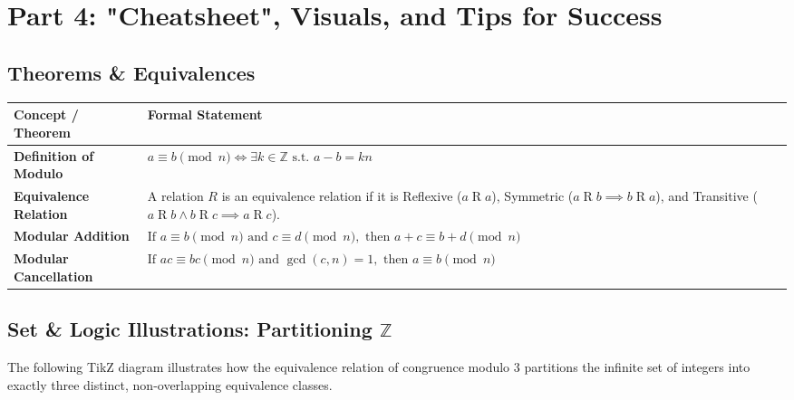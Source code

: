 \documentclass[11pt, a4paper]{article}
\theoremstyle{definition}
\theoremstyle{remark}
\begin{document}
\newpage
\section{Part 4: "Cheatsheet", Visuals, and Tips for Success}

\subsection{Theorems \& Equivalences}
\renewcommand{\arraystretch}{1.5}
\begin{tabularx}{\textwidth}{l X}
\toprule
\textbf{Concept / Theorem} & \textbf{Formal Statement} \\
\midrule
\textbf{Definition of Modulo} & $\displaystyle a \equiv b \pmod{n} \iff \exists k \in \mathbb{Z} \text{ s.t. } a - b = kn$ \\
\addlinespace[4pt]
\textbf{Equivalence Relation} & A relation $R$ is an equivalence relation if it is Reflexive ($a \mathrel{R} a$), Symmetric ($a \mathrel{R} b \implies b \mathrel{R} a$), and Transitive ($a \mathrel{R} b \land b \mathrel{R} c \implies a \mathrel{R} c$). \\
\addlinespace[4pt]
\textbf{Modular Addition} & $\displaystyle \text{If } a \equiv b \pmod{n} \text{ and } c \equiv d \pmod{n}, \text{ then } a+c \equiv b+d \pmod{n}$ \\
\addlinespace[4pt]
\textbf{Modular Cancellation} & $\displaystyle \text{If } ac \equiv bc \pmod{n} \text{ and } \gcd(c, n) = 1, \text{ then } a \equiv b \pmod{n}$ \\
\bottomrule
\end{tabularx}

\vspace{1cm}

\subsection{Set \& Logic Illustrations: Partitioning $\mathbb{Z}$}
The following TikZ diagram illustrates how the equivalence relation of congruence modulo 3 partitions the infinite set of integers into exactly three distinct, non-overlapping equivalence classes.
\end{document}
